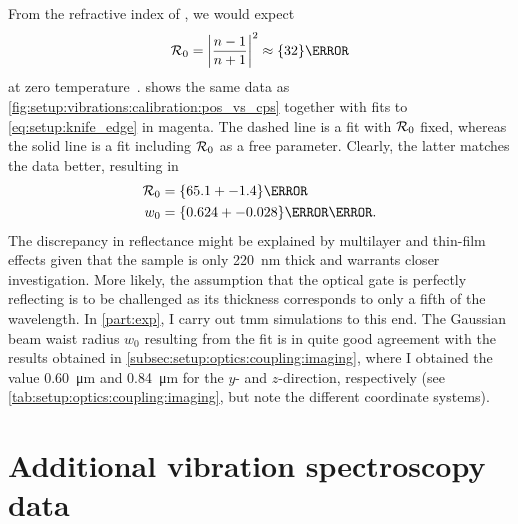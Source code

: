 From the refractive index of , we would expect
\begin{equation}
    \reflectance_0 = \abs{\frac{n-1}{n+1}}^2 \approx \qty{32}{\percent}
\end{equation}
at zero temperature~\cite{Talghader1995}.
 shows the same data as \cref{fig:setup:vibrations:calibration:pos_vs_cps} together with fits to \cref{eq:setup:knife_edge} in magenta.
The dashed line is a fit with $\mathcal{R}_0$ fixed, whereas the solid line is a fit including $\mathcal{R}_0$ as a free parameter.
Clearly, the latter matches the data better, resulting in
\begin{align}
    \reflectance_0 &= \qty{65.1+-1.4}{\percent} \\
    w_0 &= \qty{0.624+-0.028}{\micro\meter}.
\end{align}
The discrepancy in reflectance might be explained by multilayer and thin-film effects given that the sample is only \qty{220}{\nano\meter} thick and warrants closer investigation.
More likely, the assumption that the  optical gate is perfectly reflecting is to be challenged as its thickness corresponds to only a fifth of the wavelength.
In \cref{part:exp}, I carry out \gls{tmm} simulations to this end.
The Gaussian beam waist radius $w_0$ resulting from the fit is in quite good agreement with the results obtained in \cref{subsec:setup:optics:coupling:imaging}, where I obtained the value \qty{0.60}{\micro\meter} and \qty{0.84}{\micro\meter} for the $y$- and $z$-direction, respectively (see \cref{tab:setup:optics:coupling:imaging}, but note the different coordinate systems).

\section{Additional vibration spectroscopy data}\label{sec:app:setup:vibrations:data}
